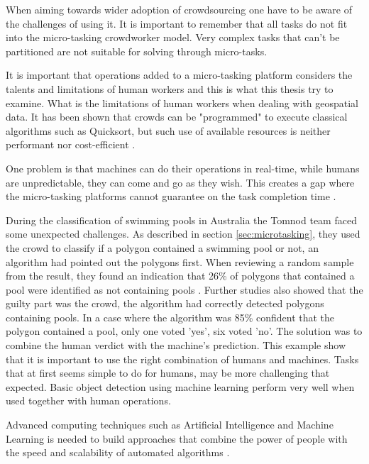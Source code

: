 When aiming towards wider adoption of crowdsourcing one have to be aware of the challenges of using it. It is important to remember that all tasks do not fit into the micro-tasking crowdworker model. Very complex tasks that can't be partitioned are not suitable for solving through micro-tasks. 

It is important that operations added to a micro-tasking platform considers the talents and limitations of human workers \citep{Franklin2011} and this is what this thesis try to examine. What is the limitations of human workers when dealing with geospatial data. It has been shown that crowds can be "programmed" to execute classical algorithms such as Quicksort, but such use of available resources is neither performant nor cost-efficient \citep{Franklin2011}. 

One problem is that machines can do their operations in real-time, while humans are unpredictable, they can come and go as they wish. This creates a gap where the micro-tasking platforms cannot guarantee on the task completion time \citep{Difallah2016}. 

During the classification of swimming pools in Australia the Tomnod team faced some unexpected challenges. As described in section \ref{sec:microtasking}, they used the crowd to classify if a polygon contained a swimming pool or not, an algorithm had pointed out the polygons first. When reviewing a random sample from the result, they found an indication that 26\% of polygons that contained a pool were identified as not containing pools \citep{Kostas2016}.  Further studies also showed that the guilty part was the crowd, the algorithm had correctly detected polygons containing pools. In a case where the algorithm was 85\% confident that the polygon contained a pool, only one voted 'yes', six voted 'no'. The solution was to combine the human verdict with the machine's prediction. This example show that it is important to use the right combination of humans and machines. Tasks that at first seems simple to do for humans, may be more challenging that expected.  Basic object detection using machine learning perform very well when used together with human operations. 

Advanced computing techniques such as Artificial Intelligence and Machine Learning is needed to build approaches that combine the power of people with the speed and scalability of automated algorithms \citep{Meier2013}. 
